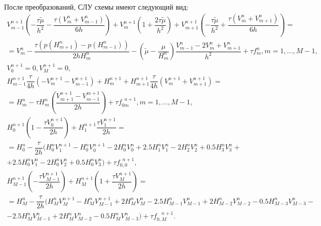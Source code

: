 \documentclass[12pt,a4paper]{article}
\begin{document}
После преобразований, СЛУ схемы имеют следующий вид:
\begin{gather*}
    V_{m-1}^{n+1}\left(-\dfrac{\tau\tilde{\mu}}{h^2}-\dfrac{\tau(V_{m}^n + V_{m-1}^n)}{6h}\right) + 
    V_{m}^{n+1}\left(1+\dfrac{2\tau\tilde{\mu}}{h^2}\right) +
    V_{m+1}^{n+1}\left(-\dfrac{\tau\tilde{\mu}}{h^2}+\dfrac{\tau(V_{m}^{n} + V_{m+1}^{n})}{6h} \right)= \\ =
    V_{m}^n-\dfrac{\tau(p(H_{m+1}^{n}) - p(H_{m-1}^n))}{2hH_m^n} -
    \left( \tilde{\mu} - \dfrac{\mu}{H_m^n} \right) \dfrac{V_{m-1}^n - 2V_{m}^n + V_{m+1}^n}{h^2} + \tau f_m^{n}
    , m = 1,\dots, M-1,\\
    V_0^{n+1} = 0, V_M^{n+1} = 0, \\
    H_{m-1}^{n+1}\dfrac{\tau}{4h}(-V_{m}^{n+1} - V_{m-1}^{n+1}) +
    H_{m}^{n+1} +
    H_{m+1}^{n+1}\dfrac{\tau}{4h}(V_{m}^{n+1} + V_{m+1}^{n+1}) = \\
    = H_{m}^{n} - \tau H_{m}^{n}\left( \dfrac{V_{m+1}^{n+1} - V_{m-1}^{m+1}}{2h} \right) + \tau f_{0m}^{\phantom{0}n+1}
    , m = 1,\dots, M-1,\\
    H_0^{n+1}\left( 1 - \dfrac{\tau V_0^{n+1}}{2h} \right) + H_1^{n+1}\dfrac{\tau V_1^{n+1}}{2h} = \\
    = H_0^{n} - \dfrac{\tau}{2h}(H_0^nV_1^{n+1} - H_0^nV_0^{n+1} - 2H_0^nV_0^n + 2.5H_1^nV_1^n - 2H_2^nV_2^n + 0.5H_3^nV_3^n + \\
    + 2.5H_0^nV_1^n - 2H_0^nV_2^n + 0.5H_0^nV_3^n) + \tau f_{0,0}^{\phantom{0}n+1}, \\
    H_{M-1}^{n+1}\left(-\dfrac{\tau V_{M-1}^{n+1}}{2h}\right) + H_M^{n+1}\left(1 + \dfrac{\tau V_M^{n+1}}{2h}\right) = \\
    = H_M^{n} - \dfrac{\tau}{2h}(H_M^nV_M^{n+1} - H_M^nV_{M-1}^{n+1} + 2H_M^nV_M^n - 2.5H_{M-1}^nV_{M-1}^n + 2H_{M-2}^nV_{M-2}^n - 0.5H_{M-3}^nV_{M-3}^n - \\
    - 2.5H_M^nV_{M-1}^n + 2H_M^nV_{M-2}^n - 0.5H_M^nV_{M-3}^n) + \tau f_{0,M}^{\phantom{0,}n+1}.
\end{gather*}






\end{document}

